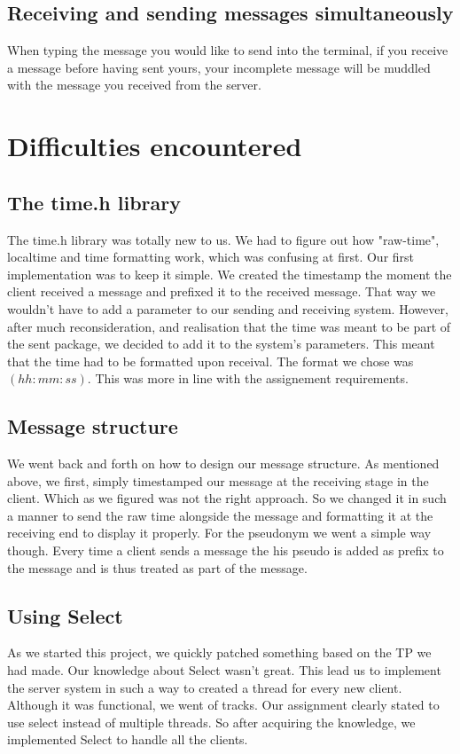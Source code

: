 \documentclass{article}
\begin{document}
\subsection{Receiving and sending messages simultaneously}
When typing the message you would like to send into the terminal, if you receive a message before having sent yours, your incomplete message will be muddled with the message you received from the server.

\section{Difficulties encountered}

\subsection{The time.h library}

The time.h library was totally new to us. We had to figure out how "raw-time", localtime and time formatting work, which was confusing at first. Our first implementation was to keep it simple. We created the timestamp the moment the client received a message and prefixed it to the received message. That way we wouldn't have to add a parameter to our sending and receiving system.
However, after much reconsideration, and realisation that the time was meant to be part of the sent package, we decided to add it to the system's parameters. This meant that the time had to be formatted upon receival. The format we chose was $(hh:mm:ss)$.
This was more in line with the assignement requirements.

\subsection{Message structure}
We went back and forth on how to design our message structure. As mentioned above, we first, simply timestamped our message at the receiving stage in the client. Which as we figured was not the right approach. So we changed it in such a manner to send the raw time alongside the message and formatting it at the receiving end to display it properly.
For the pseudonym we went a simple way though. Every time a client sends a message the his pseudo is added as prefix to the message and is thus treated as part of the message.

\subsection{Using Select}
As we started this project, we quickly patched something based on the TP we had made. Our knowledge about Select wasn't great. This lead us to implement the server system in such a way to created a thread for every new client. Although it was functional, we went of tracks. Our assignment clearly stated to use select instead of multiple threads. So after acquiring the knowledge, we implemented Select to handle all the clients.  
\end{document}
